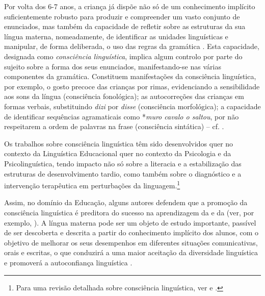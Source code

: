 \documentclass[output=paper]{LSP/langsci}
\begin{document}
Por volta dos 6-7 anos, a criança já dispõe não só de um conhecimento implícito suficientemente robusto para produzir e compreender um vasto conjunto de enunciados, mas também da capacidade de refletir sobre as estruturas da sua língua materna, nomeadamente, de identificar as unidades linguísticas e manipular, de forma deliberada, o uso das regras da gramática \citep{gombert1992,duarte2008}. Esta capacidade, designada como \textit{consciência linguística}, implica algum controlo por parte do sujeito sobre a forma dos seus enunciados, manifestando-se nas várias componentes da gramática. Constituem manifestações da consciência linguística, por exemplo, o gosto precoce das crianças por rimas, evidenciando a sensibilidade aos sons da língua (consciência fonológica); as autocorreções das crianças em formas verbais, substituindo \textit{dizi} por \textit{disse} (consciência morfológica); a capacidade de identificar sequências agramaticais como *\textit{muro cavalo o saltou}, por não respeitarem a ordem de palavras na frase (consciência sintática) – cf. \citet{goncalves_etal2011}. 

Os trabalhos sobre consciência linguística têm sido desenvolvidos quer no contexto da Linguística Educacional quer no contexto da Psicologia e da Psicolinguística, tendo impacto não só sobre a literacia e a estabilização das estruturas de desenvolvimento tardio, como também sobre o diagnóstico e a intervenção terapêutica em perturbações da linguagem.\footnote{Para uma revisão detalhada sobre consciência linguística, ver \citet{barbeiro1999} e \citet{castelo2012}.}

Assim, no domínio da Educação, alguns autores defendem que a promoção da consciência linguística é preditora do sucesso na aprendizagem da  e da  (ver, por exemplo, \citealt{hudson2001}). A língua materna pode ser um objeto de estudo importante, passível de ser descoberta e descrita a partir do conhecimento implícito dos alunos, com o objetivo de melhorar os seus desempenhos em diferentes situações comunicativas, orais e escritas, o que conduzirá a uma maior aceitação da diversidade linguística e promoverá a autoconfiança linguística \citep{duarte1998,duarte2008}. 
\end{document}
